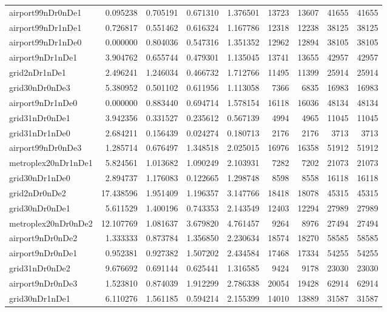 \begin{longtable}{|l|r|r|r|r|r|r|r|r|}
airport99nDr0nDe1 & 0.095238 & 0.705191 & 0.671310 & 1.376501 & 13723 & 13607 & 41655 & 41655 \\
airport99nDr1nDe1 & 0.726817 & 0.551462 & 0.616324 & 1.167786 & 12318 & 12238 & 38125 & 38125 \\
airport99nDr1nDe0 & 0.000000 & 0.804036 & 0.547316 & 1.351352 & 12962 & 12894 & 38105 & 38105 \\
airport9nDr1nDe1 & 3.904762 & 0.655744 & 0.479301 & 1.135045 & 13741 & 13655 & 42957 & 42957 \\
grid2nDr1nDe1 & 2.496241 & 1.246034 & 0.466732 & 1.712766 & 11495 & 11399 & 25914 & 25914 \\
grid30nDr0nDe3 & 5.380952 & 0.501102 & 0.611956 & 1.113058 & 7366 & 6835 & 16983 & 16983 \\
airport9nDr1nDe0 & 0.000000 & 0.883440 & 0.694714 & 1.578154 & 16118 & 16036 & 48134 & 48134 \\
grid31nDr0nDe1 & 3.942356 & 0.331527 & 0.235612 & 0.567139 & 4994 & 4965 & 11045 & 11045 \\
grid31nDr1nDe0 & 2.684211 & 0.156439 & 0.024274 & 0.180713 & 2176 & 2176 & 3713 & 3713 \\
airport99nDr0nDe3 & 1.285714 & 0.676497 & 1.348518 & 2.025015 & 16976 & 16358 & 51912 & 51912 \\
metroplex20nDr1nDe1 & 5.824561 & 1.013682 & 1.090249 & 2.103931 & 7282 & 7202 & 21073 & 21073 \\
grid30nDr1nDe0 & 2.894737 & 1.176083 & 0.122665 & 1.298748 & 8598 & 8558 & 16118 & 16118 \\
grid2nDr0nDe2 & 17.438596 & 1.951409 & 1.196357 & 3.147766 & 18418 & 18078 & 45315 & 45315 \\
grid30nDr0nDe1 & 5.611529 & 1.400196 & 0.743353 & 2.143549 & 12403 & 12294 & 27989 & 27989 \\
metroplex20nDr0nDe2 & 12.107769 & 1.081637 & 3.679820 & 4.761457 & 9264 & 8976 & 27494 & 27494 \\
airport9nDr0nDe2 & 1.333333 & 0.873784 & 1.356850 & 2.230634 & 18574 & 18270 & 58585 & 58585 \\
airport9nDr0nDe1 & 0.952381 & 0.927382 & 1.507202 & 2.434584 & 17468 & 17334 & 54255 & 54255 \\
grid31nDr0nDe2 & 9.676692 & 0.691144 & 0.625441 & 1.316585 & 9424 & 9178 & 23030 & 23030 \\
airport9nDr0nDe3 & 1.523810 & 0.874039 & 1.912299 & 2.786338 & 20054 & 19428 & 62914 & 62914 \\
grid30nDr1nDe1 & 6.110276 & 1.561185 & 0.594214 & 2.155399 & 14010 & 13889 & 31587 & 31587 \\

\end{longtable}

